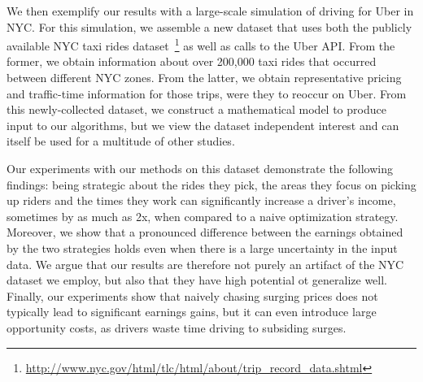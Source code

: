 We then exemplify our  results with a large-scale simulation of driving for Uber in NYC. 
For this simulation, we assemble a new dataset that uses both the publicly available NYC taxi rides 
dataset~\footnote{\url{http://www.nyc.gov/html/tlc/html/about/trip_record_data.shtml}} as well as calls to the Uber API.
From the former, we obtain information about over 200,000 taxi rides that occurred between different NYC zones. 
From the latter, we obtain representative pricing and traffic-time information for those trips, were they to reoccur on Uber.
From this newly-collected dataset, we construct a mathematical model to produce input to our algorithms,
  but we view the dataset independent interest and can itself be used for a multitude of other studies.

Our experiments with our methods on this dataset demonstrate the following findings:
being strategic about the rides they pick, the areas they focus on picking up riders
and the times they work can significantly increase a driver's income, sometimes by
as much as 2x, when compared to a naive optimization strategy.
Moreover, we show that a pronounced difference between the earnings obtained by the 
two strategies holds even when there is a large uncertainty in the input data. 
We argue that our results are therefore not purely an artifact of the NYC dataset we employ, 
  but also that they have high potential ot generalize well.
Finally, our experiments show that naively chasing surging prices does not typically lead 
  to significant earnings gains, but it can even introduce large opportunity costs, as drivers
  waste time driving to subsiding surges. 
